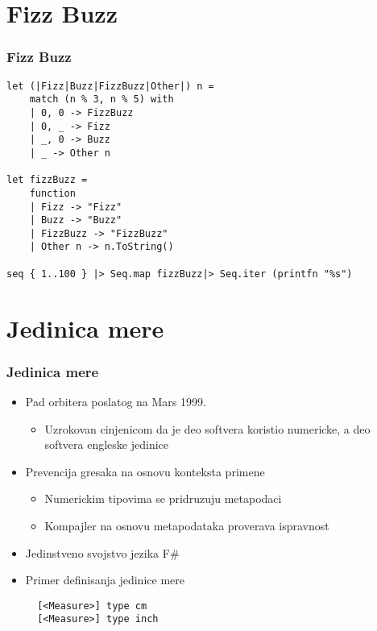 \documentclass{beamer}
\begin{document}
\section{Fizz Buzz}
\begin{frame}[fragile]
\frametitle{Fizz Buzz}

\begin{lstlisting}
let (|Fizz|Buzz|FizzBuzz|Other|) n =
    match (n % 3, n % 5) with
    | 0, 0 -> FizzBuzz
    | 0, _ -> Fizz
    | _, 0 -> Buzz
    | _ -> Other n

let fizzBuzz =
    function
    | Fizz -> "Fizz"
    | Buzz -> "Buzz"
    | FizzBuzz -> "FizzBuzz"
    | Other n -> n.ToString()

seq { 1..100 } |> Seq.map fizzBuzz|> Seq.iter (printfn "%s")
\end{lstlisting}

\end{frame}

\section{Jedinica mere}
\begin{frame}[fragile]
\frametitle{Jedinica mere}

\begin{itemize}
  \item Pad orbitera poslatog na Mars 1999.
  \begin{itemize}
  	\item Uzrokovan cinjenicom da je deo softvera koristio numericke, a deo softvera engleske jedinice
  \end{itemize}
  \item Prevencija gresaka na osnovu konteksta primene
  \begin{itemize}
  	\item Numerickim tipovima se pridruzuju metapodaci
  	\item Kompajler na osnovu metapodataka proverava ispravnost
  \end{itemize}
  \item Jedinstveno svojstvo jezika F\#
  \item Primer definisanja jedinice mere  
\begin{lstlisting}
  [<Measure>] type cm
  [<Measure>] type inch  
\end{lstlisting}
\end{itemize}
\end{frame}
\end{document}
